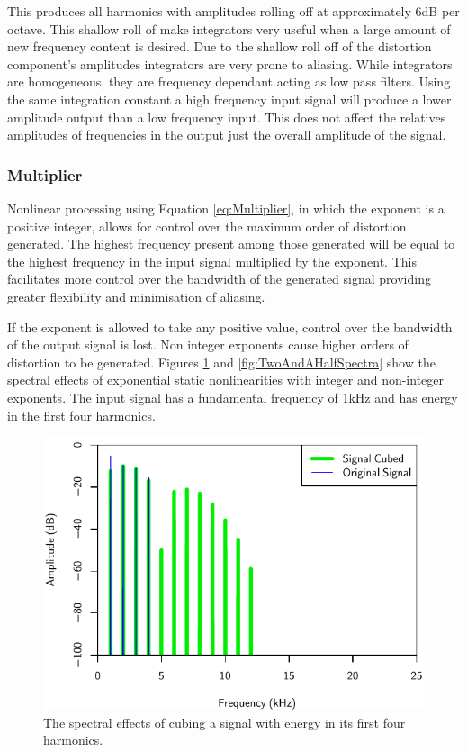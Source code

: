 			This produces all harmonics with amplitudes rolling off at approximately 6dB per octave. This
			shallow roll of make integrators very useful when a large amount of new frequency content is
			desired. Due to the shallow roll off of the distortion component's amplitudes integrators are very
			prone to aliasing. While integrators are homogeneous, they are frequency dependant acting as low
			pass filters. Using the same integration constant a high frequency input signal will produce a
			lower amplitude output than a low frequency input. This does not affect the relatives amplitudes of
			frequencies in the output just the overall amplitude of the signal.

		\subsubsection*{Multiplier}
			Nonlinear processing using Equation \ref{eq:Multiplier}, in which the exponent is a positive
			integer, allows for control over the maximum order of distortion generated. The highest frequency
			present among those generated will be equal to the highest frequency in the input signal multiplied
			by the exponent. This facilitates more control over the bandwidth of the generated signal providing
			greater flexibility and minimisation of aliasing.

			If the exponent is allowed to take any positive value, control over the bandwidth of the output
			signal is lost. Non integer exponents cause higher orders of distortion to be generated. Figures
			\ref{fig:CubedSpectra} and \ref{fig:TwoAndAHalfSpectra} show the spectral effects of exponential
			static nonlinearities with integer and non-integer exponents. The input signal has a fundamental
			frequency of 1kHz and has energy in the first four harmonics.

			\begin{figure}[h!]
				\centering
				\includegraphics{chapter5/Images/CubedSpectra.pdf}
				\caption{The spectral effects of cubing a signal with energy in its first four harmonics.}
				\label{fig:CubedSpectra}
			\end{figure}


